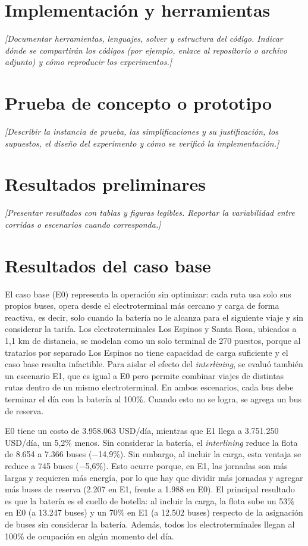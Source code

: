 \section{Implementación y herramientas}
\textit{[Documentar herramientas, lenguajes, solver y estructura del código.
Indicar dónde se compartirán los códigos (por ejemplo, enlace al repositorio o
archivo adjunto) y cómo reproducir los experimentos.]}

\section{Prueba de concepto o prototipo}
\textit{[Describir la instancia de prueba, las simplificaciones y su
justificación, los supuestos, el diseño del experimento y cómo se verificó la
implementación.]}

\section{Resultados preliminares}
\textit{[Presentar resultados con tablas y figuras legibles. Reportar la
variabilidad entre corridas o escenarios cuando corresponda.]}

\section{Resultados del caso base}

El caso base (E0) representa la operación sin optimizar: cada ruta usa solo sus propios buses, opera desde el electroterminal más cercano y carga de forma reactiva, es decir, solo cuando la batería no le alcanza para el siguiente viaje y sin considerar la tarifa. Los electroterminales Los Espinos y Santa Rosa, ubicados a 1,1 km de distancia, se modelan como un solo terminal de 270 puestos, porque al tratarlos por separado Los Espinos no tiene capacidad de carga suficiente y el caso base resulta infactible. Para aislar el efecto del \textit{interlining}, se evaluó también un escenario E1, que es igual a E0 pero permite combinar viajes de distintas rutas dentro de un mismo electroterminal. En ambos escenarios, cada bus debe terminar el día con la batería al 100\%. Cuando esto no se logra, se agrega un bus de reserva.

E0 tiene un costo de 3.958.063 USD/día, mientras que E1 llega a 3.751.250 USD/día, un 5,2\% menos. Sin considerar la batería, el \textit{interlining} reduce la flota de 8.654 a 7.366 buses ($-$14,9\%). Sin embargo, al incluir la carga, esta ventaja se reduce a 745 buses ($-$5,6\%). Esto ocurre porque, en E1, las jornadas son más largas y requieren más energía, por lo que hay que dividir más jornadas y agregar más buses de reserva (2.207 en E1, frente a 1.988 en E0). El principal resultado es que la batería es el cuello de botella: al incluir la carga, la flota sube un 53\% en E0 (a 13.247 buses) y un 70\% en E1 (a 12.502 buses) respecto de la asignación de buses sin considerar la batería. Además, todos los electroterminales llegan al 100\% de ocupación en algún momento del día.

